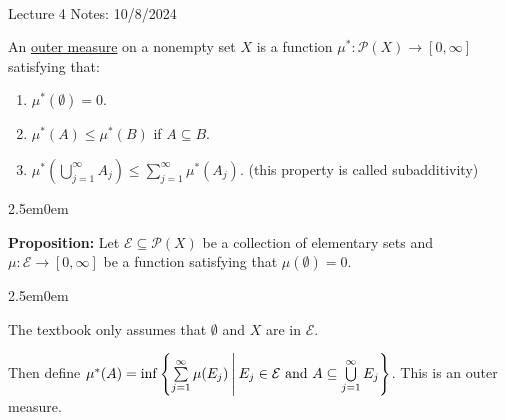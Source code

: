 \documentclass{book}
\newcommand{\hTwo}{%
\color{MidnightBlue}%
   \fontsize{13}{15}\selectfont%
}
\newcommand{\teachComment}{
   \color{Orange}%
   \fontsize{12}{14}\selectfont%
}
\newenvironment{myIndent}{%
   \begin{adjustwidth}{2.5em}{0em}%
}{%
   \end{adjustwidth}%
}
\newcommand{\udefine}[1]{{%
   \setulcolor{Red}%
   \setul{0.14em}{0.07em}%
   \ul{#1}%
}}
\newcommand{\blab}[1]{\textbf{#1}}
\newcommand{\mySepTwo}[1][.]{%
   {\noindent\color{#1}{\rule{6.5in}{0.5mm}}}\\%
}
\newcommand{\retTwo}{\hfill\bigbreak}
\newcommand{\mHeader}[1]{{
   \color{Black}%
   \fontsize{20}{18}\selectfont%
   #1\retTwo
}}
\begin{document}
\mySepTwo

\mHeader{Lecture 4 Notes: 10/8/2024}

An \udefine{outer measure} on a nonempty set $X$ is a function $\mu^*: \mathcal{P}(X) \longrightarrow [0, \infty]$\\ satisfying that:
\begin{enumerate}
   \item $\mu^*(\emptyset) = 0$.
   \item $\mu^*(A) \leq \mu^*(B)$ if $A \subseteq B$.
   \item $\mu^*(\bigcup\limits_{j = 1}^\infty A_j) \leq \sum\limits_{j=1}^\infty \mu^*(A_j)$. {\teachComment (this property is called subadditivity)}\newpage
\end{enumerate}

\begin{myIndent}\hTwo
   \blab{Proposition:} Let $\mathcal{E} \subseteq \mathcal{P}(X)$ be a collection of elementary sets and $\mu: \mathcal{E} \longrightarrow [0, \infty]$ be a function satisfying that $\mu(\emptyset) = 0$.
   \begin{myIndent}\teachComment
      The textbook only assumes that $\emptyset$ and $X$ are in $\mathcal{E}$.
   \end{myIndent}

   Then define $\mu^*(A) = \inf\left\{\sum\limits_{j = 1}^\infty \mu(E_j)\hspace{0.2em} \middle| \hspace{0.2em} E_j \in \mathcal{E} \text{ and } A \subseteq \bigcup\limits_{j = 1}^\infty E_j\right\}$. This is an outer\\ [-9pt] measure.\retTwo


\end{myIndent}
\end{document}
